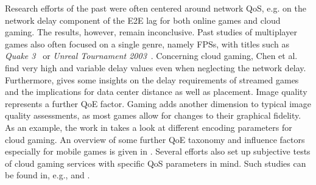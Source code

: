 Research efforts of the past were often centered around network \acrshort{QoS}, e.g. on the network delay component of the \gls{E2E} lag for both online games and cloud gaming. The results, however, remain inconclusive. Past studies of multiplayer games also often focused on a single genre, namely \glspl{FPS}, with titles such as \textit{Quake 3}~\cite{1266180} or \textit{Unreal Tournament 2003}~\cite{Beigbeder:2004:ELL:1016540.1016556}. Concerning cloud gaming, Chen et al.~\cite{6670099} find very high and variable delay values even when neglecting the network delay. Furthermore, \cite{Choy:2012:BSC:2501560.2501563} gives some insights on the delay requirements of streamed games and the implications for data center distance as well as placement.
Image quality represents a further \gls{QoE} factor. Gaming adds
another dimension to typical image quality assessments, as most
games allow for changes to their graphical fidelity.
As an example, the work in \cite{slivarimpact} takes a look at different encoding parameters for cloud gaming.%
An overview of some further \gls{QoE} taxonomy and influence factors especially for mobile games is given in \cite{beyer2014typedisplaydelayimpact}. Several efforts also set up subjective tests of cloud gaming services with specific \gls{QoS} parameters in mind. Such studies can be found in, e.g., \cite{Jarschel20132883} and  \cite{6614351}.

